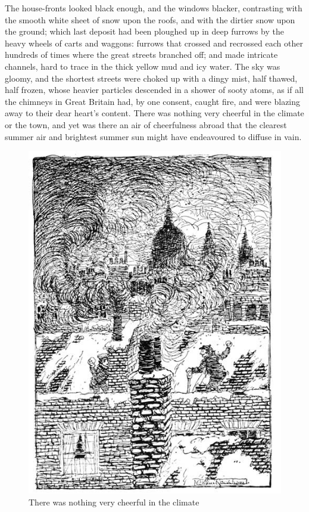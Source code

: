 \documentclass[paper=a5,BCOR=15mm,twoside,DIV=15,headinclude=off,12pt,chapterprefix=off,openany,headings=huge]{scrbook} %
\begin{document}
The house-fronts looked black enough, and the windows blacker, contrasting with the smooth white sheet of snow upon the roofs, and with the dirtier snow upon the ground; which last deposit had been ploughed up in deep furrows by the heavy wheels of carts and waggons: furrows that crossed and recrossed each other hundreds of times where the great streets branched off; and made intricate channels, hard to trace in the thick yellow mud and icy water. The sky was gloomy, and the shortest streets were choked up with a dingy mist, half thawed, half frozen, whose heavier particles descended in a shower of sooty atoms, as if all the chimneys in Great Britain had, by one consent, caught fire, and were blazing away to their dear heart's content. There was nothing very cheerful in the climate or the town, and yet was there an air of cheerfulness abroad that the clearest summer air and brightest summer sun might have endeavoured to diffuse in vain.

\begin{figure}
\begin{minipage}[c]{\linewidth}
\includegraphics[width=\linewidth]{gs100}
\caption*{There was nothing very cheerful in the climate}
\end{minipage}
\end{figure}
\end{document}
